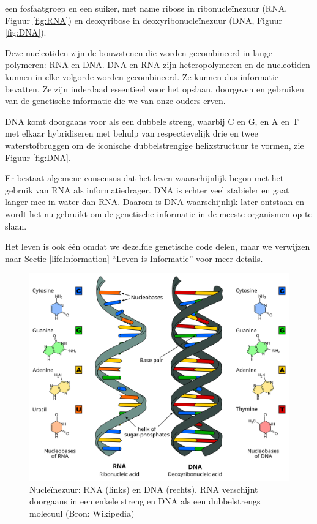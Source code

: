 \documentclass[
  11pt,
]{book}
\begin{document}
een fosfaatgroep en een suiker, met name ribose in ribonucleïnezuur (RNA, Figuur \ref{fig:RNA}) en deoxyribose in deoxyribonucleïnezuur (DNA, Figuur \ref{fig:DNA}).

Deze nucleotiden zijn de bouwstenen die worden gecombineerd in lange polymeren: RNA en DNA. DNA en RNA zijn heteropolymeren en de nucleotiden kunnen in elke volgorde worden gecombineerd. Ze kunnen dus informatie bevatten. Ze zijn inderdaad essentieel voor het opslaan, doorgeven en gebruiken van de genetische informatie die we van onze ouders erven.

DNA komt doorgaans voor als een dubbele streng, waarbij C en G, en A en T met elkaar hybridiseren met behulp van respectievelijk drie en twee waterstofbruggen om de iconische dubbelstrengige helixstructuur te vormen, zie Figuur \ref{fig:DNA}.

Er bestaat algemene consensus dat het leven waarschijnlijk begon met het gebruik van RNA als informatiedrager. DNA is echter veel stabieler en gaat langer mee in water dan RNA. Daarom is DNA waarschijnlijk later ontstaan en wordt het nu gebruikt om de genetische informatie in de meeste organismen op te slaan.

Het leven is ook één omdat we dezelfde genetische code delen, maar we verwijzen naar Sectie \ref{lifeInformation} ``Leven is Informatie'' voor meer details.

\begin{figure}

{\centering \includegraphics[width=0.5\linewidth]{./figs/Difference_DNA_RNA-EN} 

}

\caption{Nucleïnezuur: RNA (links) en DNA (rechts). RNA verschijnt doorgaans in een enkele streng en DNA als een dubbelstrengs molecuul (Bron: Wikipedia)}\label{fig:RNAvsDNA}
\end{figure}
\end{document}
